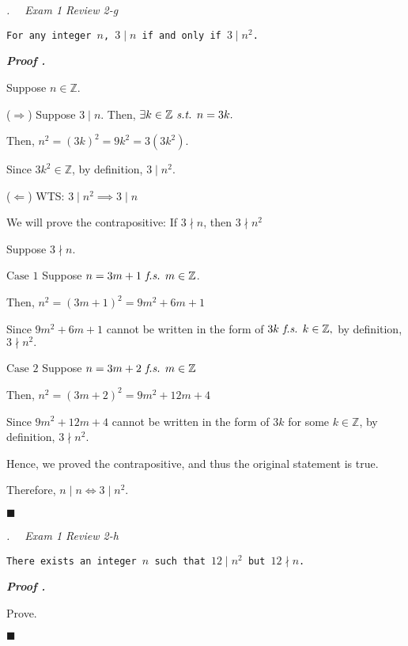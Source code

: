 \documentclass[10pt,letter]{article}
\newcounter{nq}[section]
\newcounter{np}[section]
\newenvironment*{p}{\par\noindent\textbf{\textit{Proof \stepcounter{np}\thenp. }}\par}{\par\hfill $\blacksquare$\par}
\newenvironment*{q}[1]{\noindent\emph{\thesection.\stepcounter{nq}\thenq$\quad $ #1}\par\noindent\texttt}{}
\def\Z{{\mathbb{Z}}}
\def\st{\emph{ s.t. }}
\def\fs{\emph{ f.s. }}
\begin{document}
\begin{framed}\begin{q}
	{Exam 1 Review 2-g}
	{For any integer $n$, $3\mid n$ if and only if $3\mid n^2$.}
\end{q}\end{framed}
\begin{p}
	Suppose $n\in\Z$.\par($\Rightarrow$) Suppose $3\mid n$. Then, $\exists k\in\Z\st n=3k.$\par\hspace{5mm}Then, $n^2=(3k)^2=9k^2=3(3k^2).$\par\hspace{5mm}Since $3k^2\in\Z$, by definition, $3\mid n^2.$\par($\Leftarrow$) WTS: $3\mid n^2\implies3\mid n$\par\hspace{5mm}We will prove the contrapositive: If $3\nmid n$, then $3\nmid n^2$\par\hspace{5mm}Suppose $3\nmid n.$\par\hspace{5mm}$\boxed{\text{Case }1}$ Suppose $n=3m+1\fs m\in\Z$.\par\hspace{10mm}Then, $n^2=(3m+1)^2=9m^2+6m+1$\par\hspace{10mm}Since $9m^2+6m+1$ cannot be written in the form of $3k\fs k\in\Z,$ by definition, $3\nmid n^2.$\par\hspace{5mm}$\boxed{\text{Case }2}$ Suppose $n=3m+2\fs m\in\Z$\par\hspace{10mm}Then, $n^2=(3m+2)^2=9m^2+12m+4$\par\hspace{10mm}Since $9m^2+12m+4$ cannot be written in the form of $3k$ for some $k\in\Z$, by definition, $3\nmid n^2.$\par\hspace{5mm} Hence, we proved the contrapositive, and thus the original statement is true.\par Therefore, $n\mid n\iff 3\mid n^2.$
\end{p}

\begin{framed}\begin{q}
	{Exam 1 Review 2-h}
	{There exists an integer $n$ such that $12\mid n^2$ but $12\nmid n$.}
\end{q}\end{framed}
\begin{p}
	Prove.	
\end{p}
\end{document}
